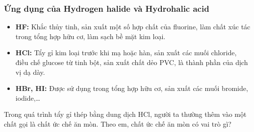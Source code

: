 \documentclass[Main.tex]{subfiles}
\begin{document}
\subsubsection{Ứng dụng của Hydrogen halide và Hydrohalic acid}
    \begin{hopdongian}
        \begin{itemize}
            \item \textbf{HF:} Khắc thủy tinh, sản xuất một số hợp chất của fluorine, làm chất xúc tác trong tổng hợp hữu cơ, làm sạch bề mặt kim loại.
            \item \textbf{HCl:} Tẩy gỉ kim loại trước khi mạ hoặc hàn, sản xuất các muối chloride, điều chế glucose từ tinh bột, sản xuất chất dẻo PVC, là thành phần của dịch vị dạ dày.
            \item \textbf{HBr, HI:} Được sử dụng trong tổng hợp hữu cơ, sản xuất các muối bromide, iodide,\ldots
        \end{itemize}
    \end{hopdongian}
    \begin{hoivadap}
        Trong quá trình tẩy gỉ thép bằng dung dịch HCl, người ta thường thêm vào một chất gọi là chất ức chế ăn mòn. Theo em, chất ức chế ăn mòn có vai trò gì?
    \end{hoivadap}
\end{document}
